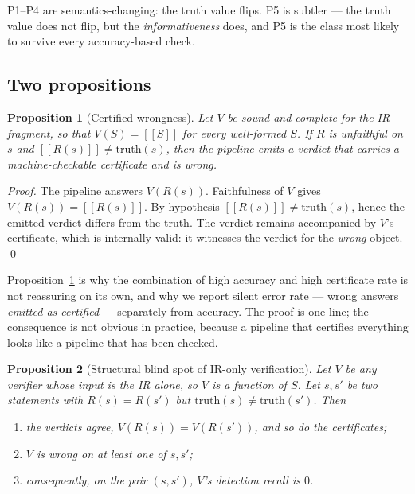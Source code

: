 \documentclass[11pt]{article}
\providecommand{\llbracket}{[\![}
\providecommand{\rrbracket}{]\!]}
\newtheorem{proposition}{Proposition}
\theoremstyle{definition}
\begin{document}
P1--P4 are semantics-changing: the truth value flips. P5 is subtler --- the truth
value does not flip, but the \emph{informativeness} does, and P5 is the class most
likely to survive every accuracy-based check.

\subsection{Two propositions}
\label{sec:props}

\begin{proposition}[Certified wrongness]
\label{prop:sound}
Let $V$ be sound and complete for the IR fragment, so that $V(S) =
\llbracket S \rrbracket$ for every well-formed $S$. If $R$ is unfaithful on $s$
\emph{and} $\llbracket R(s) \rrbracket \neq \mathrm{truth}(s)$, then the pipeline
emits a verdict that carries a machine-checkable certificate and is wrong.
\end{proposition}

\begin{proof}
The pipeline answers $V(R(s))$. Faithfulness of $V$ gives $V(R(s)) = \llbracket
R(s) \rrbracket$. By hypothesis $\llbracket R(s) \rrbracket \neq
\mathrm{truth}(s)$, hence the emitted verdict differs from the truth. The
verdict remains accompanied by $V$'s certificate, which is internally valid: it
witnesses the verdict for the \emph{wrong} object. \qed
\end{proof}

Proposition~\ref{prop:sound} is why the combination of high accuracy and high
certificate rate is not reassuring on its own, and why we report silent error
rate --- wrong answers \emph{emitted as certified} --- separately from accuracy.
The proof is one line; the consequence is not obvious in practice, because a
pipeline that certifies everything looks like a pipeline that has been checked.

\begin{proposition}[Structural blind spot of IR-only verification]
\label{prop:blind}
Let $V$ be any verifier whose input is the IR alone, so $V$ is a function of $S$.
Let $s, s'$ be two statements with $R(s) = R(s')$ but $\mathrm{truth}(s) \neq
\mathrm{truth}(s')$. Then
\begin{enumerate}
  \item the verdicts agree, $V(R(s)) = V(R(s'))$, and so do the certificates;
  \item $V$ is wrong on at least one of $s, s'$;
  \item consequently, on the pair $(s, s')$, $V$'s detection recall is $0$.
\end{enumerate}
\end{proposition}
\end{document}
